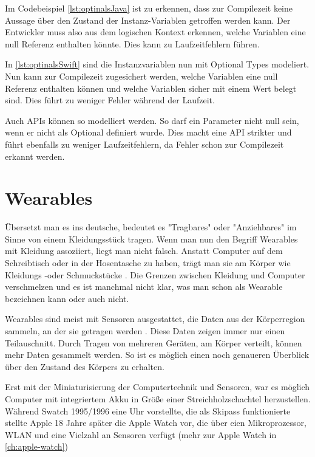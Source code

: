 Im Codebeispiel \ref{lst:optinalsJava} ist zu erkennen, dass zur Compilezeit keine Aussage über den Zustand der Instanz-Variablen getroffen werden kann. Der Entwickler muss also aus dem logischen Kontext erkennen, welche Variablen eine null Referenz enthalten könnte. Dies kann zu Laufzeitfehlern führen.


In \ref{lst:optinalsSwift} sind die Instanzvariablen nun mit Optional Types modeliert. Nun 
kann zur Compilezeit zugesichert werden, welche Variablen eine null Referenz enthalten können und welche Variablen sicher mit einem Wert belegt sind. Dies führt zu weniger Fehler während der Laufzeit.

Auch APIs können so modelliert werden. So darf ein Parameter nicht null sein, wenn er nicht als Optional definiert wurde. Dies macht eine API strikter und führt ebenfalls zu weniger Laufzeitfehlern, da Fehler schon zur Compilezeit erkannt werden.

\section{Wearables}
Übersetzt man es ins deutsche, bedeutet es "Tragbares" oder "Anziehbares" im Sinne von einem Kleidungsstück tragen. Wenn man nun den Begriff Wearables mit Kleidung assoziiert, liegt man nicht falsch. Anstatt Computer auf dem Schreibtisch oder in der Hosentasche zu haben, trägt man sie am Körper wie Kleidungs -oder Schmuckstücke \cite{Dvorak:2008aa}. Die Grenzen zwischen Kleidung und Computer verschmelzen und es ist manchmal nicht klar, was man schon als Wearable bezeichnen kann oder auch nicht.

Wearables sind meist mit Sensoren ausgestattet, die Daten aus der Körperregion sammeln, an der sie getragen werden \cite{4711366}. Diese Daten zeigen immer nur einen Teilauschnitt. Durch Tragen von mehreren Geräten, am Körper verteilt, können mehr Daten gesammelt werden. So ist es möglich einen noch genaueren Überblick über den Zustand des Körpers zu erhalten\cite{4711366}.

Erst mit der Miniaturisierung der Computertechnik und Sensoren, war es möglich Computer mit integriertem Akku in Größe einer Streichholzschachtel herzustellen. Während Swatch 1995/1996  eine Uhr vorstellte, die als Skipass funktionierte stellte Apple 18 Jahre später die Apple Watch vor, die über eien Mikroprozessor, WLAN und eine Vielzahl an Sensoren verfügt (mehr zur Apple Watch in \ref{ch:apple-watch})

